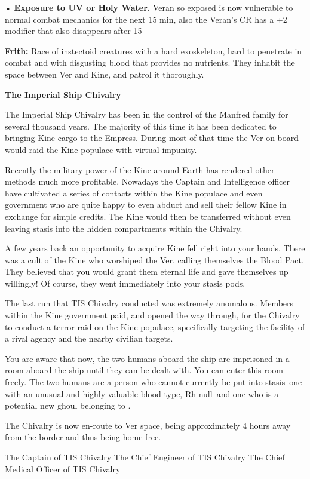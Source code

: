 \documentclass[blue]{guildcamp4}
\begin{document}
•	{\bf Exposure to UV or Holy Water.} Veran so exposed is now vulnerable to normal combat mechanics for the next 15 min, also the Veran's CR has a +2 modifier that also disappears after 15

{\bf Frith:} Race of instectoid creatures with a hard exoskeleton, hard to penetrate in combat and with disgusting blood that provides no nutrients. They inhabit the space between Ver and Kine, and patrol it thoroughly.

\begin{center}{\bf The Imperial Ship Chivalry}\end{center}

The Imperial Ship Chivalry has been in the control of the Manfred family for several thousand years. The majority of this time it has been dedicated to bringing Kine cargo to the Empress. During most of that time the Ver on board would raid the Kine populace with virtual impunity.

Recently the military power of the Kine around Earth has rendered other methods much more profitable. Nowadays the Captain and Intelligence officer have cultivated a series of contacts within the Kine populace and even government who are quite happy to even abduct and sell their fellow Kine in exchange for simple credits. The Kine would then be transferred without even leaving stasis into the hidden compartments within the Chivalry. 

A few years back an opportunity to acquire Kine fell right into your hands. There was a cult of the Kine who worshiped the Ver, calling themselves the Blood Pact. They believed that you would grant them eternal life and gave themselves up willingly! Of course, they went immediately into your stasis pods.

The last run that TIS Chivalry conducted was extremely anomalous. Members within the Kine government paid, and opened the way through, for the Chivalry to conduct a terror raid on the Kine populace, specifically targeting the facility of a rival agency and the nearby civilian targets. 

You are aware that now, the two humans aboard the ship are imprisoned in a room aboard the ship until they can be dealt with. You can enter this room freely. The two humans are a person who cannot currently be put into stasis--one with an unusual and highly valuable blood type, Rh null--and one who is a potential new ghoul belonging to \cVone{}.

The Chivalry is now en-route to Ver space, being approximately 4 hours away from the border and thus being home free.

\begin{members}
	\member{\cVone{}} The Captain of TIS Chivalry
	\member{\cVtwo{}} The Chief Engineer of TIS Chivalry
	\member{\cVthree{}} The Chief Medical Officer of TIS Chivalry

\end{members}
\end{document}
